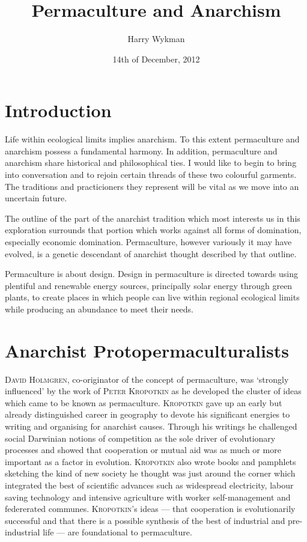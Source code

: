 \documentclass[a4paper, 11pt]{article}
\begin{document}
\title{Permaculture and Anarchism}
\author{Harry Wykman}
\date{14th of December, 2012}
\maketitle
\begin{multicols*}{2}

\section*{Introduction}
Life within ecological limits implies anarchism.  To this extent permaculture and anarchism possess a fundamental harmony.  In addition, permaculture and anarchism share historical and philosophical ties.  I would like to begin to bring into conversation and to rejoin certain threads of these two colourful garments.  The traditions and practicioners they represent will be vital as we move into an uncertain future.

The outline of the part of the anarchist tradition which most interests us in this exploration surrounds that portion which works against all forms of domination, especially economic domination.  Permaculture, however variously it may have evolved, is a genetic descendant of anarchist thought described by that outline.

Permaculture is about design.  Design in permaculture is directed towards using plentiful and renewable energy sources, principally solar energy through green plants, to create places in which people can live within regional ecological limits while producing an abundance to meet their needs.

\section*{Anarchist Protopermaculturalists}
 \textsc{David Holmgren}, co-originator of the concept of permaculture, was `strongly influenced' by the work of \textsc{Peter Kropotkin} as he developed the cluster of ideas which came to be known as permaculture.  \textsc{Kropotkin} gave up an early but already distinguished career in geography to devote his significant energies to writing and organising for anarchist causes. Through his writings he challenged social Darwinian notions of competition as the sole driver of evolutionary processes and showed that cooperation or mutual aid was as much or more important as a factor in evolution.  \textsc{Kropotkin} also wrote books and pamphlets sketching the kind of new society he thought was just around the corner which integrated the best of scientific advances such as widespread electricity, labour saving technology and intensive agriculture with worker self-management and federerated communes.  \textsc{Kropotkin}'s ideas --- that cooperation is evolutionarily successful and that there is a possible synthesis of the best of industrial and pre-industrial life --- are foundational to permaculture.


\end{multicols*}
\end{document}
